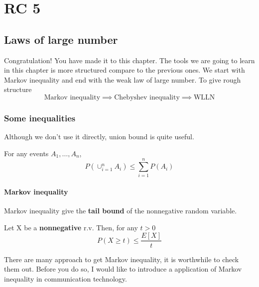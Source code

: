 \chapter{RC 5}

\section{Laws of large number}
Congratulation! You have made it to this chapter. The tools we are going to learn in this chapter is more structured compare to the previous ones. 
We start with Markov inequality and end with the weak law of large number. To give rough structure
\[
    \text{Markov inequality} \implies \text{Chebyshev inequality} \implies \text{WLLN}  
\]

\subsection{Some inequalities}
Although we don't use it directly, union bound is quite useful.
\begin{note}
   For any events \(A_1, \dots, A_n\),
   \[
    P(\cup_{i =1}^n A_i) \leq  \sum_{i=1}^{n} P(A_i)
   \]  
\end{note}
\subsubsection*{Markov inequality}
Markov inequality give the \textbf{tail bound} of the nonnegative random variable.  
\begin{note}
    Let X be a \textbf{nonnegative} r.v.  Then, for any \(t > 0\)
    \[
        P(X \geq  t) \leq \frac{E[X]}{t}
    \] 
\end{note}
There are many approach to get Markov inequality, it is worthwhile to check them out. 
Before you do so, I would like to introduce a application of Markov inequality in communication technology. 
